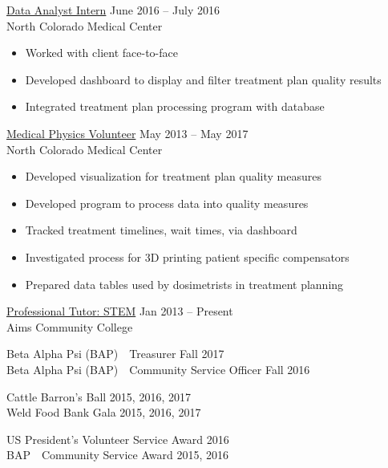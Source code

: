 \documentclass[11pt]{article}
\begin{document}
\begin{description}[leftmargin=!,labelwidth=2cm,align=right]
    \underline{Data Analyst Intern} \hfill June 2016 -- July 2016\\
    North Colorado Medical Center
    \begin{itemize}[rightmargin=2cm,noitemsep]
        \item Worked with client face-to-face
        \item Developed dashboard to display and filter treatment plan quality results
        \item Integrated treatment plan processing program with database
    \end{itemize}

    \underline{Medical Physics Volunteer} \hfill May 2013 -- May 2017\\
    North Colorado Medical Center
    \begin{itemize}[rightmargin=2cm,noitemsep]
        \item Developed visualization for treatment plan quality measures
        \item Developed program to process data into quality measures
        \item Tracked treatment timelines, wait times, via dashboard
        \item Investigated process for 3D printing patient specific compensators
        \item Prepared data tables used by dosimetrists in treatment planning
    \end{itemize}

    \underline{Professional Tutor: STEM} \hfill Jan 2013 -- Present\\
    Aims Community College

\item[Leadership]
    Beta Alpha Psi (BAP)\ \ Treasurer \hfill Fall 2017\\
    Beta Alpha Psi (BAP)\ \ Community Service Officer \hfill Fall 2016\\

\item[Volunteering]
	Cattle Barron's Ball \hfill 2015, 2016, 2017\\
	Weld Food Bank Gala \hfill 2015, 2016, 2017

\item[Awards]
    US President's Volunteer Service Award \hfill 2016\\
    BAP\ \ Community Service Award \hfill 2015, 2016\\


\end{description}
\end{document}
